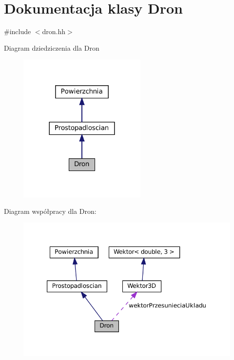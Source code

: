 \hypertarget{class_dron}{}\section{Dokumentacja klasy Dron}
\label{class_dron}


{\ttfamily \#include $<$dron.\+hh$>$}



Diagram dziedziczenia dla Dron\nopagebreak
\begin{figure}[H]
\begin{center}
\leavevmode
\includegraphics[width=180pt]{class_dron__inherit__graph}
\end{center}
\end{figure}


Diagram współpracy dla Dron\+:\nopagebreak
\begin{figure}[H]
\begin{center}
\leavevmode
\includegraphics[width=347pt]{class_dron__coll__graph}
\end{center}
\end{figure}
